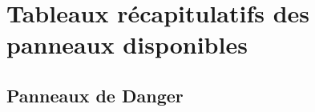 \documentclass[french,11pt,a4paper]{article}
\begin{document}
\begin{demohigh}[language=latex/latex3,style/main=cyan!5,style/code=cyan!5,style/demo=cyan!5]
\end{demohigh}

\pagebreak

\section{Tableaux récapitulatifs des panneaux disponibles}

\subsection{Panneaux de Danger}
\end{document}
